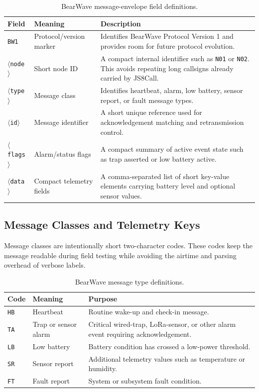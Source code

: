 \documentclass[acmsmall,screen]{acmart}
\begin{document}
\begin{table}[tbp]
\centering
\caption{BearWave message-envelope field definitions.}
\label{tab:message-fields}
\begin{tabularx}{\textwidth}{p{}p{}X}
\toprule
Field & Meaning & Description \\
\midrule
\texttt{BW1} & Protocol/version marker & Identifies BearWave Protocol Version 1 and provides room for future protocol evolution. \\
\(\langle\)\texttt{node}\(\rangle\) & Short node ID & A compact internal identifier such as \texttt{N01} or \texttt{N02}. This avoids repeating long callsigns already carried by JS8Call. \\
\(\langle\)\texttt{type}\(\rangle\) & Message class & Identifies heartbeat, alarm, low battery, sensor report, or fault message types. \\
\(\langle\)\texttt{id}\(\rangle\) & Message identifier & A short unique reference used for acknowledgement matching and retransmission control. \\
\(\langle\)\texttt{flags}\(\rangle\) & Alarm/status flags & A compact summary of active event state such as trap asserted or low battery active. \\
\(\langle\)\texttt{data}\(\rangle\) & Compact telemetry fields & A comma-separated list of short key-value elements carrying battery level and optional sensor values. \\
\bottomrule
\end{tabularx}
\end{table}

\subsection{Message Classes and Telemetry Keys}
Message classes are intentionally short two-character codes. These codes keep the message readable during field testing while avoiding the airtime and parsing overhead of verbose labels.

\begin{table}[tbp]
\centering
\caption{BearWave message type definitions.}
\label{tab:message-types}
\begin{tabularx}{\textwidth}{p{}p{}X}
\toprule
Code & Meaning & Purpose \\
\midrule
\texttt{HB} & Heartbeat & Routine wake-up and check-in message. \\
\texttt{TA} & Trap or sensor alarm & Critical wired-trap, LoRa-sensor, or other alarm event requiring acknowledgement. \\
\texttt{LB} & Low battery & Battery condition has crossed a low-power threshold. \\
\texttt{SR} & Sensor report & Additional telemetry values such as temperature or humidity. \\
\texttt{FT} & Fault report & System or subsystem fault condition. \\
\bottomrule
\end{tabularx}
\end{table}
\end{document}
